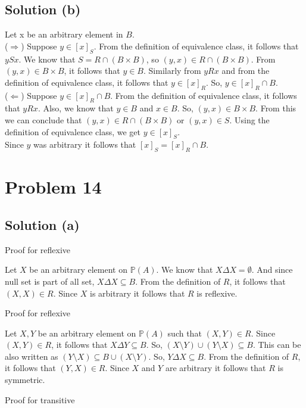 \documentclass{article}
\begin{document}
\subsection{Solution (b)}
Let x be an arbitrary element in $B$. \\
($\Rightarrow$) Suppose $y \in [x]_S$. From the definition of
equivalence class, it follows that $ySx$. We know that $S = R \cap (B
\times B)$, so $(y,x) \in R \cap (B \times B)$. From $(y,x) \in B
\times B$, it follows that $y \in B$. Similarly from $yRx$ and from
the definition of equivalence class, it follows that $y \in [x]_R$.
So, $y \in [x]_R \cap B$. \\

\noindent
($\Leftarrow$) Suppose $y \in [x]_R \cap B$. From the definition of
equivalence class, it follows that $yRx$. Also, we know that $y \in B$
and $x \in B$. So, $(y,x) \in B \times B$. From this we can conclude
that $(y,x) \in R \cap (B \times B)$ or $(y,x) \in S$. Using the
definition of equivalence class, we get $y \in [x]_S$.
\\
Since $y$ was arbitrary it follows that $[x]_S = [x]_R \cap B$.

\section{Problem 14}
\subsection{Solution (a)}
Proof for reflexive

Let $X$ be an arbitrary element on $\mathbb{P}(A)$. We know that $X
\Delta X = \emptyset$. And since null set is part of all set, $X \Delta
X \subseteq B$. From the definition of $R$, it follows that $(X,X) \in
R$. Since $X$ is arbitrary it follows that $R$ is reflexive.

Proof for reflexive

Let $X,Y$ be an arbitrary element on $\mathbb{P}(A)$ such that $(X,Y)
\in R$. Since $(X,Y) \in R$, it follows that $X \Delta Y \subseteq B$.
So, $(X \setminus Y) \cup (Y \setminus X) \subseteq B$. This can be
also written as $(Y \setminus X) \subseteq B \cup (X \setminus Y)$.
So, $Y \Delta X \subseteq B$. From the definition of $R$, it follows
that $(Y,X) \in R$. Since $X$ and $Y$ are arbitrary it follows that
$R$ is symmetric.

Proof for transitive
\end{document}
